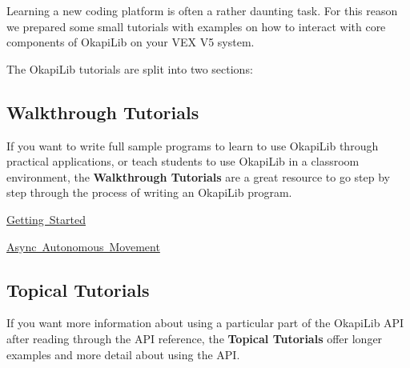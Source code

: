Learning a new coding platform is often a rather daunting task. For this reason we prepared some small tutorials with examples on how to interact with core components of Okapi\+Lib on your V\+EX V5 system.

The Okapi\+Lib tutorials are split into two sections\+:

\subsection*{Walkthrough Tutorials}

If you want to write full sample programs to learn to use Okapi\+Lib through practical applications, or teach students to use Okapi\+Lib in a classroom environment, the {\bfseries{Walkthrough Tutorials}} are a great resource to go step by step through the process of writing an Okapi\+Lib program.


\begin{DoxyItemize}
\item \mbox{\hyperlink{md_docs_tutorials_walkthrough_gettingStarted}{Getting Started}}
\item \mbox{\hyperlink{md_docs_tutorials_walkthrough_asyncAutonomousMovement}{Async Autonomous Movement}}
\end{DoxyItemize}

\subsection*{Topical Tutorials}

If you want more information about using a particular part of the Okapi\+Lib A\+PI after reading through the A\+PI reference, the {\bfseries{Topical Tutorials}} offer longer examples and more detail about using the A\+PI. 